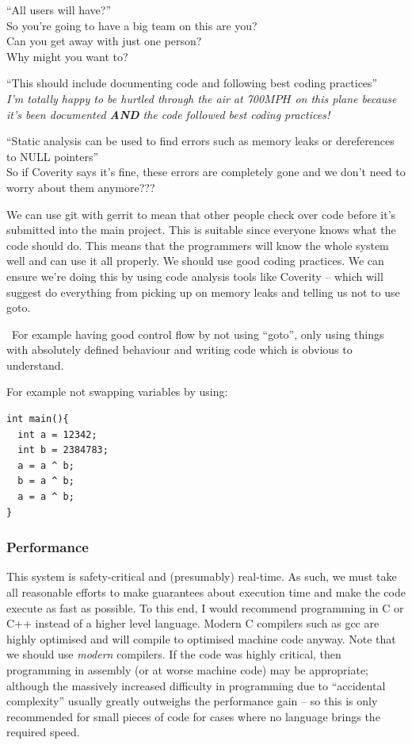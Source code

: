\documentclass[10pt,\jkfside,a4paper]{article}
\begin{document}
\begin{enumerate}
\begin{enumerate}[label=(\alph*)]
{\color{blue}
``All users will have?'' \\
So you're going to have a big team on this are you?\\
Can you get away with just one person?\\
Why might you want to?
}

{\color{blue}
``This should include documenting code and following best coding practices''\\
\textit{I'm totally happy to be hurtled through the air at 700$MPH$ on this
plane because it's been documented \textbf{AND} the code followed best coding practices!}
}

{\color{blue}
``Static analysis can be used to find errors such as memory leaks or dereferences to NULL pointers''\\
So if Coverity says it's fine, these errors are completely gone and we don't need to worry about them anymore???
}

We can use git with gerrit to mean that other people check over code before it's submitted into the main project.
This is suitable since everyone knows what the code should do.
This means that the programmers will know the whole system well and can use it all properly.
We should use good coding practices.
We can ensure we're doing this by using code analysis tools like Coverity -- which will suggest
do everything from picking up on memory leaks and telling us not to use goto.

\dag \ For example having good control flow by not using ``goto'', only using things with absolutely defined
behaviour and writing code which is obvious to understand.

For example not swapping variables by using:

\begin{lstlisting}[style=cstyle,label={lst:swap_no_temp}]
int main(){
  int a = 12342;
  int b = 2384783;
  a = a ^ b;
  b = a ^ b;
  a = a ^ b;
}
\end{lstlisting}

\subsubsection*{Performance}

This system is safety-critical and (presumably) real-time.
As such, we must take all reasonable efforts to make guarantees about execution time and make the code execute as
fast as possible.
To this end, I would recommend programming in C or C++ instead of a higher level language.
Modern C compilers such as gcc are highly optimised and will compile to optimised
machine code anyway. Note that we should use \textit{modern} compilers.
If the code was highly critical, then programming in assembly (or at worse machine code)
may be appropriate; although the massively increased difficulty in programming due to
``accidental complexity'' usually greatly outweighs the performance gain -- so this is only
recommended for small pieces of code for cases where no language brings the required
speed.


\end{enumerate}
\end{enumerate}
\end{document}
